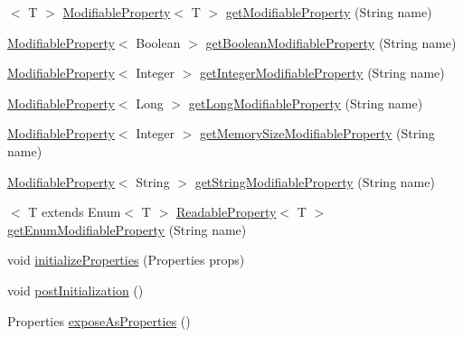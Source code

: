 \begin{DoxyCompactItemize}
\item 
$<$ T $>$ \mbox{\hyperlink{interfacecom_1_1mysql_1_1cj_1_1conf_1_1_modifiable_property}{Modifiable\+Property}}$<$ T $>$ \mbox{\hyperlink{interfacecom_1_1mysql_1_1cj_1_1conf_1_1_property_set_a1f0bf657fdc759cd12424b7820811aac}{get\+Modifiable\+Property}} (String name)
\item 
\mbox{\hyperlink{interfacecom_1_1mysql_1_1cj_1_1conf_1_1_modifiable_property}{Modifiable\+Property}}$<$ Boolean $>$ \mbox{\hyperlink{interfacecom_1_1mysql_1_1cj_1_1conf_1_1_property_set_acb80d7a26b31af0bdaf61158268f8655}{get\+Boolean\+Modifiable\+Property}} (String name)
\item 
\mbox{\hyperlink{interfacecom_1_1mysql_1_1cj_1_1conf_1_1_modifiable_property}{Modifiable\+Property}}$<$ Integer $>$ \mbox{\hyperlink{interfacecom_1_1mysql_1_1cj_1_1conf_1_1_property_set_a23c7b32f5aa0b61cd6b23ae0a712673b}{get\+Integer\+Modifiable\+Property}} (String name)
\item 
\mbox{\hyperlink{interfacecom_1_1mysql_1_1cj_1_1conf_1_1_modifiable_property}{Modifiable\+Property}}$<$ Long $>$ \mbox{\hyperlink{interfacecom_1_1mysql_1_1cj_1_1conf_1_1_property_set_a19570f2efd6239cdacbf6628113b574f}{get\+Long\+Modifiable\+Property}} (String name)
\item 
\mbox{\hyperlink{interfacecom_1_1mysql_1_1cj_1_1conf_1_1_modifiable_property}{Modifiable\+Property}}$<$ Integer $>$ \mbox{\hyperlink{interfacecom_1_1mysql_1_1cj_1_1conf_1_1_property_set_a8cc24f5252be30243814c05679700586}{get\+Memory\+Size\+Modifiable\+Property}} (String name)
\item 
\mbox{\hyperlink{interfacecom_1_1mysql_1_1cj_1_1conf_1_1_modifiable_property}{Modifiable\+Property}}$<$ String $>$ \mbox{\hyperlink{interfacecom_1_1mysql_1_1cj_1_1conf_1_1_property_set_ac67409f3c62157f17e4dfb2ccd320e84}{get\+String\+Modifiable\+Property}} (String name)
\item 
$<$ T extends Enum$<$ T $>$ \mbox{\hyperlink{interfacecom_1_1mysql_1_1cj_1_1conf_1_1_readable_property}{Readable\+Property}}$<$ T $>$ \mbox{\hyperlink{interfacecom_1_1mysql_1_1cj_1_1conf_1_1_property_set_ac4b27fd4d71b53f1af527c93058fec49}{get\+Enum\+Modifiable\+Property}} (String name)
\item 
void \mbox{\hyperlink{interfacecom_1_1mysql_1_1cj_1_1conf_1_1_property_set_a4d0959318c1dd50f8d73a4aabcacd2ae}{initialize\+Properties}} (Properties props)
\item 
void \mbox{\hyperlink{interfacecom_1_1mysql_1_1cj_1_1conf_1_1_property_set_a1e590d8f29a11f3231099aa1c163f987}{post\+Initialization}} ()
\item 
Properties \mbox{\hyperlink{interfacecom_1_1mysql_1_1cj_1_1conf_1_1_property_set_a1742a6e5438541b51a5794654bf98489}{expose\+As\+Properties}} ()
\end{DoxyCompactItemize}


